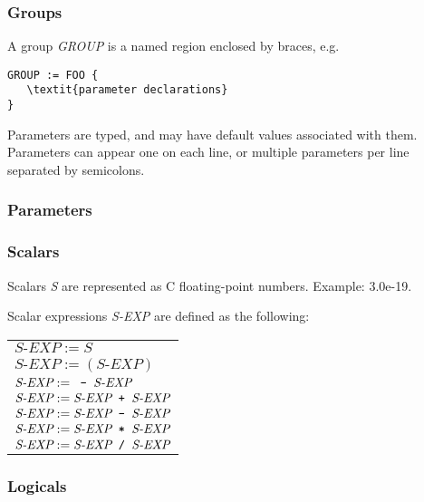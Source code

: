 \subsubsection{Groups}

A group \textit{GROUP} is a named region enclosed by braces, e.g.

\begin{verbatim}
GROUP := FOO { 
   \textit{parameter declarations} 
}
\end{verbatim}


Parameters are typed, and may have default values associated with
them.  Parameters can appear one on each line, or multiple parameters
per line separated by semicolons.

\subsubsection{Parameters} 

\subsubsection{Scalars}

Scalars \textit{S} are represented as C floating-point numbers.  Example: 3.0e-19.

Scalar expressions \textit{S-EXP} are defined as the following:

\begin{tabular}{|l|} \hline
$\textit{S-EXP} := S$  \\
$\textit{S-EXP} := (\textit{S-EXP})$ \\
$\textit{S-EXP} := \verb. - . \textit{S-EXP}$ \\
$\textit{S-EXP} := \textit{S-EXP} \verb. + . \textit{S-EXP}$ \\
$\textit{S-EXP} := \textit{S-EXP} \verb. - . \textit{S-EXP}$ \\
$\textit{S-EXP} := \textit{S-EXP} \verb. * . \textit{S-EXP}$ \\
$\textit{S-EXP} := \textit{S-EXP} \verb. / . \textit{S-EXP}$ \\ \hline
\end{tabular}

\subsubsection{Logicals}


